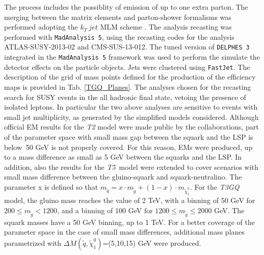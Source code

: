 \documentclass[a4paper,10pt]{article}
\newcommand{\Tfive}{ \textit{T5}}
\begin{document}
%
The process includes the possiblity of emission of up to one extra parton. The merging between the matrix elements and parton-shower formalisms was performed adopting the $k_T \ jet$ MLM scheme \cite{MLM,Alwall:2007fs}. 
%
The analysis recasting was performed with \texttt{MadAnalysis 5}, using the recasting codes for the analysis ATLAS-SUSY-2013-02\cite{ATLAS-SUSY-2013-02MA5,ATLAS-SUSY-2013-02VALIDATION} and CMS-SUS-13-012\cite{CMS-SUS-13-012MA5,CMS-SUS-13-012VALIDATION}. The tuned version of \texttt{DELPHES 3} integrated in the \texttt{MadAnalysis 5} framework was used to perform the simulate the detector effects on the particle objects. Jets were clustered using \texttt{FastJet}\cite{Cacciari:2011ma}.
%
The description of the grid of mass points defined for the production of the efficiency maps is provided in Tab. \ref{TGQ_Planes}. The analyses chosen for the recasting search for SUSY events in the all hadronic final state, vetoing the presence of isolated leptons. In particular the two above analyses are sensitive to events with small jet multiplicity, as generated by the simplified models considered. Although official EM results for the \textit{T2} model were made public by the collaborations, part of the parameter space with small mass gap between the squark and the LSP is below $~$50 GeV is not properly covered. For this reason, EMs were produced, up to a mass difference as small as 5 GeV between the squarks and the LSP. In addition, also the results for the \Tfive~model were extended to cover scenarios with small mass difference between the gluino-squark and squark-neutralino. The parameter x is defined so that $m_{\tilde q}= x\cdot m_{\tilde g} + (1-x)\cdot m_{\tilde \chi_1 ^0}$. For the \textit{T3GQ} model, the gluino mass reaches the value of 2 TeV, with a binning of 50 GeV for $200 \leq m_{\tilde g} < 1200$, and a binning of 100 GeV for $1200 \leq m_{\tilde g}  \leq 2000$ GeV. {\color{blue} The squark masses have a 50 GeV binning, up to 1 TeV. } For a better coverage of the parameter space in the case of small mass differences, additional mass planes parametrized with $\Delta M ( \tilde q, \tilde \chi _1 ^0)$=(5,10,15) GeV were produced.
%
\end{document}
